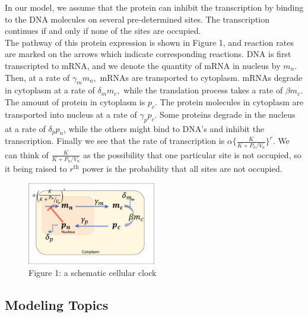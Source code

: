 \documentclass[12pt]{article}
\renewcommand{\(}{\left (}
\renewcommand{\)}{\right )}
\begin{document}
In our model, we assume that the protein can inhibit the transcription by binding to the DNA molecules on several pre-determined sites. The transcription continues if and only if none of the sites are occupied. \\

The pathway of this protein expression is shown in Figure 1, and reaction rates are marked on the arrows which indicate corresponding reactions. DNA is first transcripted to mRNA, and we denote the quantity of mRNA in nucleus by $m_n$. Then, at a rate of $\gamma_m m_n,$ mRNAs are transported to cytoplasm. mRNAs degrade in cytoplasm at a rate of $\delta_m m_c,$ while the translation process takes a rate of $\beta m_c$. The amount of protein in cytoplasm is $p_c$. The protein molecules in cytoplasm are transported into nucleus at a rate of $\gamma_p p_c$. Some proteins degrade in the nucleus at a rate of $\delta_p p_n$, while the others might bind to DNA's and inhibit the transcription. Finally we see that the rate of transcription is $\alpha \{\frac{K}{K + P_n / V_n}\}^r.$ We can think of $\frac{K}{K + P_n / V_n}$ as the possibility that one particular site is not occupied, so it being raised to $r^\text{th}$ power is the probability that all sites are not occupied.


\begin {figure}[t]
	\centering
	\includegraphics[width=0.5\textwidth]{pathway.png}
	\caption*{\small Figure 1: a schematic cellular clock}
\end {figure}

\subsection{Modeling Topics}
\end{document}
